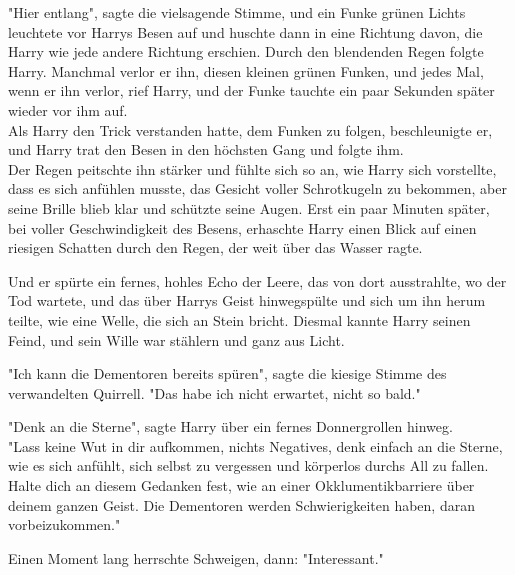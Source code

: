 {"Hier entlang", sagte die vielsagende Stimme, und ein Funke grünen Lichts leuchtete vor Harrys Besen auf und huschte dann in eine Richtung davon, die Harry wie jede andere Richtung erschien. Durch den blendenden Regen folgte Harry. Manchmal verlor er ihn, diesen kleinen grünen Funken, und jedes Mal, wenn er ihn verlor, rief Harry, und der Funke tauchte ein paar Sekunden später wieder vor ihm auf.\\ Als Harry den Trick verstanden hatte, dem Funken zu folgen, beschleunigte er, und Harry trat den Besen in den höchsten Gang und folgte ihm.\\ Der Regen peitschte ihn stärker und fühlte sich so an, wie Harry sich vorstellte, dass es sich anfühlen musste, das Gesicht voller Schrotkugeln zu bekommen, aber seine Brille blieb klar und schützte seine Augen. Erst ein paar Minuten später, bei voller Geschwindigkeit des Besens, erhaschte Harry einen Blick auf einen riesigen Schatten durch den Regen, der weit über das Wasser ragte.

Und er spürte ein fernes, hohles Echo der Leere, das von dort ausstrahlte, wo der Tod wartete, und das über Harrys Geist hinwegspülte und sich um ihn herum teilte, wie eine Welle, die sich an Stein bricht. Diesmal kannte Harry seinen Feind, und sein Wille war stählern und ganz aus Licht.

"Ich kann die Dementoren bereits spüren", sagte die kiesige Stimme des verwandelten Quirrell. "Das habe ich nicht erwartet, nicht so bald."

"Denk an die Sterne", sagte Harry über ein fernes Donnergrollen hinweg.\\ "Lass keine Wut in dir aufkommen, nichts Negatives, denk einfach an die Sterne, wie es sich anfühlt, sich selbst zu vergessen und körperlos durchs All zu fallen.\\ Halte dich an diesem Gedanken fest, wie an einer Okklumentikbarriere über deinem ganzen Geist. Die Dementoren werden Schwierigkeiten haben, daran vorbeizukommen."

Einen Moment lang herrschte Schweigen, dann: "Interessant."

}

